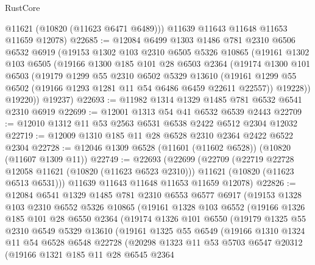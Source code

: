 \begin{lexlean}{RustCore}
\begin{coremodule}
        @11621
        (@10820 (@11623 @6471 @6489)))
      @11639
      @11643
      @11648
      @11653
      @11659
      @12078)
@22685 := @12084
    @6499
    @1303
    @1486
    @781
    @2310
    @6506
    @6532
    @6919
    (@19153
      @1302
      @103
      @2310
      @6505
      @5326
      @10865
      (@19161
        @1302
        @103
        @6505
        (@19166
          @1300
          @185
          @101
          @28
          @6503
          @2364
          (@19174
            @1300
            @101
            @6503
            (@19179
              @1299
              @55
              @2310
              @6502
              @5329
              @13610
              (@19161 @1299 @55 @6502 (@19166 @1293 @1281 @11 @54 @6486 @6459 @22611 @22557))
              @19228))
          @19220))
      @19237)
@22693 := @11982 @1314 @1329 @1485 @781 @6532 @6541 @2310 @6919
@22699 := @12001 @1313 @54 @41 @6532 @6539 @2443
@22709 := @12010 @1312 @11 @53 @2563 @6531 @6538 @2422 @6512 @2304 @12032
@22719 := @12009 @1310 @185 @11 @28 @6528 @2310 @2364 @2422 @6522 @2304
@22728 := @12046 @1309 @6528 (@11601 (@11602 @6528)) (@10820 (@11607 @1309 @11))
@22749 := @22693
    (@22699
      (@22709
        (@22719 @22728 @12058 @11621 (@10820 (@11623 @6523 @2310)))
        @11621
        (@10820 (@11623 @6513 @6531)))
      @11639
      @11643
      @11648
      @11653
      @11659
      @12078)
@22826 := @12084
    @6541
    @1329
    @1485
    @781
    @2310
    @6553
    @6577
    @6917
    (@19153
      @1328
      @103
      @2310
      @6552
      @5326
      @10865
      (@19161
        @1328
        @103
        @6552
        (@19166
          @1326
          @185
          @101
          @28
          @6550
          @2364
          (@19174
            @1326
            @101
            @6550
            (@19179
              @1325
              @55
              @2310
              @6549
              @5329
              @13610
              (@19161
                @1325
                @55
                @6549
                (@19166
                  @1310
                  @1324
                  @11
                  @54
                  @6528
                  @6548
                  @22728
                  (@20298
                    @1323
                    @11
                    @53
                    @5703
                    @6547
                    @20312
                    (@19166
                      @1321
                      @185
                      @11
                      @28
                      @6545
                      @2364

\end{coremodule}
\end{lexlean}
